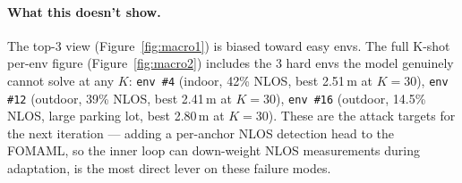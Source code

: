 \documentclass[11pt,letterpaper]{article}
\begin{document}
\paragraph{What this doesn't show.}
The top-3 view (Figure~\ref{fig:macro1}) is biased toward easy
envs.  The full K-shot per-env figure
(Figure~\ref{fig:macro2}) includes the 3 hard envs the model
genuinely cannot solve at any $K$: \verb|env #4| (indoor,
42\% NLOS, best 2.51\,m at $K{=}30$), \verb|env #12| (outdoor,
39\% NLOS, best 2.41\,m at $K{=}30$), \verb|env #16|
(outdoor, 14.5\% NLOS, large parking lot, best 2.80\,m at
$K{=}30$).  These are the
attack targets for the next iteration --- adding a per-anchor
NLOS detection head to the FOMAML, so the inner loop can
down-weight NLOS measurements during adaptation, is the most
direct lever on these failure modes.
\end{document}
